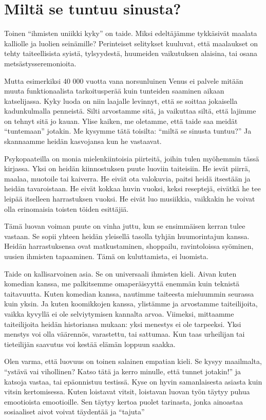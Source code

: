 \section{Miltä se tuntuu sinusta?}

Toinen ``ihmisten uniikki kyky'' on taide. Miksi edeltäjämme tykkäsivät maalata kalliolle ja luolien seinämille? Perinteiset selitykset kuuluvat, että maalaukset on tehty taiteellisista syistä, tylsyydestä, huumeiden vaikutuksen alaisina, tai osana metsästysseremonioita.

Mutta esimerkiksi 40 000 vuotta vana norsunluinen Venus ei palvele mitään muuta funktionaalista tarkoitusperää kuin tunteiden saaminen aikaan katselijassa. Kyky luoda on niin laajalle levinnyt, että se soittaa jokaisella kadunkulmalla penneistä. Silti arvostamme sitä, ja vaikuttaa siltä, että lajimme on tehnyt sitä jo kauan. Ylise kaiken, me oletamme, että taide saa meidät ``tuntemaan'' jotakin. Me kysymme tätä toisilta: ``miltä se sinusta tuntuu?'' Ja skannaamme heidän kasvojansa kun he vastaavat.

Psykopaateilla on monia mielenkiintoisia piirteitä, joihin tulen myöhemmin tässä kirjassa. Yksi on heidän kiinnostuksen puute luoviin taiteisiin. He ievät piirrä, maalaa, muotoile tai kaiverra. He eivät ota valokuvia, paitsi heidä itsestään ja heidän tavaroistaan. He eivät kokkaa huvin vuoksi, keksi reseptejä, eivätkä he tee leipää itselleen harrastuksen vuoksi. He eivät luo musiikkia, vaikkakin he voivat olla erinomaisia toisten töiden esittäjiä.

Tämä luovan voiman puute on vinha juttu, kun se ensimmäisen kerran tulee vastaan. Se sopii yhteen heidän yleisellä tasolla tyhjän huumorintajun kanssa. Heidän harrastuksensa ovat matkustaminen, shoppailu, ravintoloissa syöminen, uusien ihmisten tapaaminen. Tämä on kuluttamista, ei luomista.

Taide on kallisarvoinen asia. Se on universaali ihmisten kieli. Aivan kuten komedian kanssa, me palkitsemme omaperäisyyttä enemmän kuin teknistä taitavuutta. Kuten komedian kanssa, nautimme taiteesta mieluummin seurassa kuin yksin. Ja kuten koomikkojen kanssa, ylistämme ja arvostamme taiteilijoita, vaikka kyvyllä ei ole selviytymisen kannalta arvoa. Viimeksi, mittaamme taiteilijoita heidän historiansa mukaan: yksi menestys ei ole tarpeeksi. Yksi menstys voi olla väärennös, varastettu, tai sattumaa. Kun taas urheilijan tai tieteilijän saavutus voi kestää elämän loppuun saakka.

Olen varma, että luovuus on toinen salainen empatian kieli. Se kysyy maailmalta, ``ystävä vai vihollinen? Katso tätä ja kerro minulle, että tunnet jotakin!'' ja katsoja vastaa, tai epäonnistuu testissä. Kyse on hyvin samanlaisesta asiasta kuin vitsin kertomisessa. Kuten loistavat vitsit, loistavan luovan työn täytyy puhua emootioista emootioille. Sen täytyy kertoa puolet tarinasta, jonka ainoastaa sosiaaliset aivot voivat täydentää ja ``tajuta''

